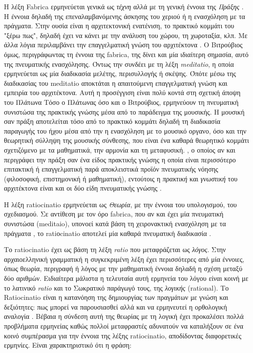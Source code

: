 \begin{description}[style=nextline]
\item[Fabrica]

Η λέξη Fabrica ερμηνεύεται γενικά ως \emph{τέχνη} αλλά με τη γενική έννοια της \emph{Πράξης} \cite{vitruvius-lefas,graham-education}. Η έννοια δηλαδή της επεναλαμβανόμενης άσκησης του χεριού ή η ενασχόληση με τα πράγματα. Στην ουσία είναι η αρχιτεκτονική ενατένιση, το πρακτικό κομμάτι του "ξέρω πως", δηλαδή έχει να κάνει με την ανάλυση του χώρου, τη χωροταξία, κλπ. Με άλλα λόγια περιλαμβάνει την επαγγελματική γνώση του αρχιτέκτονα \cite{graham-education}. Ο Βιτρούβιος όμως, περιγράφωντας τη έννοια της fabrica, της δίνει και μία ιδιαίτερη σημασία, αυτό της πνευματικής ενασχόλησης. Όντως την συνδέει με τη λέξη \emph{meditatio}, η οποία ερμηνεύεται ως μία διαδικασία μελέτης, περισυλλογής ή σκέψης. Όπότε μέσω της διαδικασίας του meditatio αποκτάται η απαιτούμενη επαγγελματική γνώση και εμπειρία του αρχιτέκτονα. Αυτή η προσέγγιση είναι πολύ κοντά στη σχετική άποψη του Πλάτωνα\sidenote%
{Τόσο ο Πλάτωνας όσο και ο Βιτρούβιος, ερμηνεύουν τη πνευματική συνιστώσα της πρακτικής γνώσης μέσα από το παράδειγμα της μουσικής. Η μουσική σαν πράξη αποτελείται τόσο από το πρακτικό κομμάτι δηλαδή τη διαδικασία παραγωγής του ήχου μέσα από την η ενασχόληση με το μουσικό οργανο, όσο και την θεωρητική σύλληψη της μουσικής σύνθεσης, που είναι ένα καθαρά θεωρητικό κομμάτι σχετιζόμενο με τα μαθηματικά, την αρμονία και τη μεταφυσική.}
, ο οποίος αν και περιγράφει την πράξη σαν ένα είδος πρακτικής γνώσης η οποία είναι περισσότερο επιτακτική ή επαγγελματική παρά αποκλειστικά προϊόν πνευματικής νόησης (φιλοσοφική, επιστημονική ή μαθηματική), εντούτοις η \emph{πρακτική} και \emph{γνωστική} του αρχιτέκτονα είναι και οι δύο είδη πνευματικής γνώσης \cite{graham-education}.  


\item[Ratiocinatio]

Η λέξη ratiocinatio ερμηνεύεται ως \emph{Θεωρία}, με την έννοια του υπολογισμού, του σχεδιασμού. Σε αντίθεση με τον όρο fabrica, που αν και έχει μία πνευματική συνιστώσα (meditaio), υπονοεί κατά βάση τη χειρονακτική ενασχόληση με τα πράγματα , το ratiοcinatio αποτελεί μία καθαρά πνευματική διαδικασία \cite{vitruvius-lefas}.

Το ratiocinatio έχει ως βάση τη λέξη \emph{ratio} που μεταφράζεται ως \emph{λόγος}. Στην αρχαιοελληνική γραμματική η συγκεκριμένη λέξη έχει περισσότερες από μία έννοιες, όπως θεωρία, περιγραφή ή λόγος με την μαθηματική έννοια δηλαδή η σχέση μεταξύ δύο αριθμών. Ειδιαίτερα μάλιστα η τελευταία αυτή ερμηνεία του λόγου είναι κοινή με το λατινικό \emph{ratio} και το Σωκρατικό παράγωγό τους, της \emph{λογικής} (rational). Το Ratiocinatio είναι η κατανόηση της δημιουργίας των πραγμάτων με γνώση και δεξιότητες: πως μπορεί να παρουσιασθεί αλλά και να ερμηνευτεί η ορθολογική αναλογία \cite{patterson-1997}.  Βέβαια η σύνδεση αυτή της θεωρίας με τη λογική έχει προκαλέσει πολλά προβλήματα ερμηνείας καθώς πολλοί μεταφραστές αδυνατούν να καταλήξουν σε ένα κοινό συμπέρασμα για την έννοια της λέξης ratiocinatio, αποδίδοντας διαφορετικές ερμηνίες. Είναι χαρακτηριστικό ότι η φράση:


\end{description}
